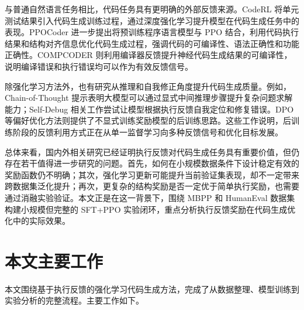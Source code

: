 与普通自然语言任务相比，代码任务具有更明确的外部反馈来源。CodeRL 将单元测试结果引入代码生成训练过程，通过深度强化学习提升模型在代码生成任务中的表现\cite{Le2022CodeRL}。PPOCoder 进一步提出将预训练程序语言模型与 PPO 结合，利用代码执行结果和结构对齐信息优化代码生成过程，强调代码的可编译性、语法正确性和功能正确性\cite{Shojaee2023PPOCoder}。COMPCODER 则利用编译器反馈提升神经代码生成结果的可编译性，说明编译错误和执行错误均可以作为有效反馈信号\cite{Wang2022CompCoder}。

除强化学习方法外，也有研究从推理和自我修正角度提升代码生成质量。例如，Chain-of-Thought 提示表明大模型可以通过显式中间推理步骤提升复杂问题求解能力\cite{Wei2022CoT}；Self-Debug 相关工作尝试让模型根据执行反馈自我定位和修复错误\cite{Chen2023SelfDebug}。DPO 等偏好优化方法则提供了不显式训练奖励模型的后训练思路\cite{Rafailov2023DPO}。这些工作说明，后训练阶段的反馈利用方式正在从单一监督学习向多种反馈信号和优化目标发展。

总体来看，国内外相关研究已经证明执行反馈对代码生成任务具有重要价值，但仍存在若干值得进一步研究的问题。首先，如何在小规模数据条件下设计稳定有效的奖励函数仍不明确；其次，强化学习更新可能提升当前验证集表现，却不一定带来跨数据集泛化提升；再次，更复杂的结构奖励是否一定优于简单执行奖励，也需要通过消融实验验证。本文正是在这一背景下，围绕 MBPP 和 HumanEval 数据集构建小规模但完整的 SFT+PPO 实验闭环，重点分析执行反馈奖励在代码生成优化中的实际效果。

\section{本文主要工作}

本文围绕基于执行反馈的强化学习代码生成方法，完成了从数据整理、模型训练到实验分析的完整流程。主要工作如下。

